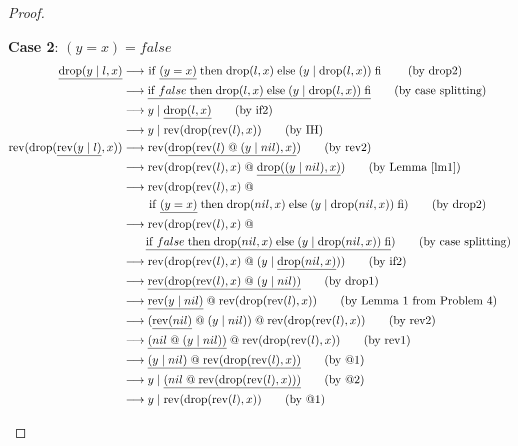 \documentclass[12pt, a4paper]{article}
\newcommand{\rel}[1]{\mathrel{#1}}
\newcommand{\rmx}[1]{\mathrm{#1}}
\newcommand{\larrow}{\longrightarrow}
\newcommand{\under}{\underline}
\begin{document}
\begin{proof}
\begin{description}
\textbf{Case 2}: $(y = x) = false$
\begin{align*}
\under{\rmx{drop}(y \rel{|} l, x)}
	&\larrow\ \rel{\rmx{if}} \under{(y = x)} \rel{\rmx{then}} \rmx{drop}(l, x) \rel{\rmx{else}} (y \rel{|} \rmx{drop}(l, x)) \rel{\rmx{fi}} \tag{by drop2} \\
	&\larrow \under{\rel{\rmx{if}} false \rel{\rmx{then}} \rmx{drop}(l, x) \rel{\rmx{else}} (y \rel{|} \rmx{drop}(l, x)) \rel{\rmx{fi}}} \tag{by case splitting} \\
	&\larrow y \rel{|} \under{\rmx{drop}(l, x)} \tag{by if2} \\
	&\larrow y \rel{|} \rmx{rev}(\rmx{drop}(\rmx{rev}(l), x)) \tag{by IH} \\
\rmx{rev}(\rmx{drop}(\under{\rmx{rev}(y \rel{|} l)}, x))
	&\larrow \rmx{rev}(\under{\rmx{drop}(\rmx{rev}(l) \rel{@} (y \rel{|} nil), x)}) \tag{by rev2} \\
	&\larrow \rmx{rev}(\rmx{drop}(\rmx{rev}(l), x) \rel{@} \under{\rmx{drop}((y \rel{|} nil), x)}) \tag{by Lemma~\ref{lm1}} \\
	&\larrow \rmx{rev}(\rmx{drop}(\rmx{rev}(l), x) \rel{@} \\
	&\quad \quad \rel{\rmx{if}} \under{(y = x)} \rel{\rmx{then}} \rmx{drop}(nil, x) \rel{\rmx{else}} (y \rel{|} \rmx{drop}(nil, x)) \rel{\rmx{fi}}) \tag{by drop2} \\
	&\larrow \rmx{rev}(\rmx{drop}(\rmx{rev}(l), x) \rel{@} \\
	&\quad \quad \under{\rel{\rmx{if}} false \rel{\rmx{then}} \rmx{drop}(nil, x) \rel{\rmx{else}} (y \rel{|} \rmx{drop}(nil, x)) \rel{\rmx{fi}}}) \tag{by case splitting} \\
	&\larrow \rmx{rev}(\rmx{drop}(\rmx{rev}(l), x) \rel{@} (y \rel{|} \under{\rmx{drop}(nil, x)})) \tag{by if2} \\
	&\larrow \under{\rmx{rev}(\rmx{drop}(\rmx{rev}(l), x) \rel{@} (y \rel{|} nil))} \tag{by drop1} \\
	&\larrow \under{\rmx{rev}(y \rel{|} nil)} \rel{@} \rmx{rev}(\rmx{drop}(\rmx{rev}(l), x)) \tag{by Lemma 1 from Problem 4} \\
	&\larrow (\under{\rmx{rev}(nil)} \rel{@} (y \rel{|} nil)) \rel{@} \rmx{rev}(\rmx{drop}(\rmx{rev}(l), x)) \tag{by rev2} \\
	&\larrow \under{(nil \rel{@} (y \rel{|} nil))} \rel{@} \rmx{rev}(\rmx{drop}(\rmx{rev}(l), x)) \tag{by rev1} \\
	&\larrow \under{(y \rel{|} nil) \rel{@} \rmx{rev}(\rmx{drop}(\rmx{rev}(l), x))} \tag{by @1} \\
	&\larrow y \rel{|} \under{(nil \rel{@} \rmx{rev}(\rmx{drop}(\rmx{rev}(l), x)))} \tag{by @2} \\
	&\larrow y \rel{|} \rmx{rev}(\rmx{drop}(\rmx{rev}(l), x)) \tag{by @1}
\end{align*}

\end{description}

\end{proof}
\end{document}
